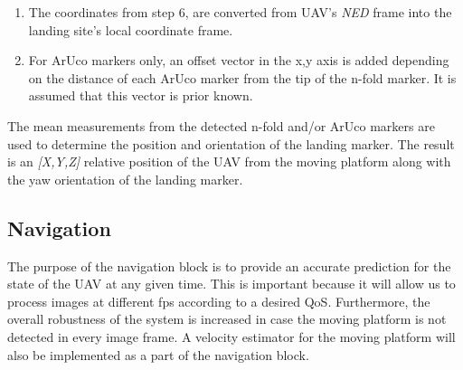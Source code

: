\documentclass[conference]{IEEEtran}
\begin{document}
\begin{enumerate}


\item The coordinates from step 6, are converted from UAV's \emph{NED} frame into the landing site's local coordinate frame.


\item For ArUco markers only, an offset vector in the x,y axis is added depending on the distance of each ArUco marker from the tip of the n-fold marker. It is assumed that this vector is prior known.

\end{enumerate}
%
The mean measurements from the detected n-fold and/or ArUco markers
are used to determine the position and orientation of the landing
marker. The result is an \emph{[X,Y,Z]} relative position of the UAV from
the moving platform along with the yaw orientation of the landing
marker.


\subsection{Navigation}
\label{sec:Navigation}

The purpose of the navigation block is to provide an accurate
prediction for the state of the UAV at any given time. This is
important because it will allow us to process images at different fps
according to a desired QoS. Furthermore, the overall robustness of the
system is increased in case the moving platform is not detected in
every image frame. A velocity estimator for the moving platform will
also be implemented as a part of the navigation block.
\end{document}
